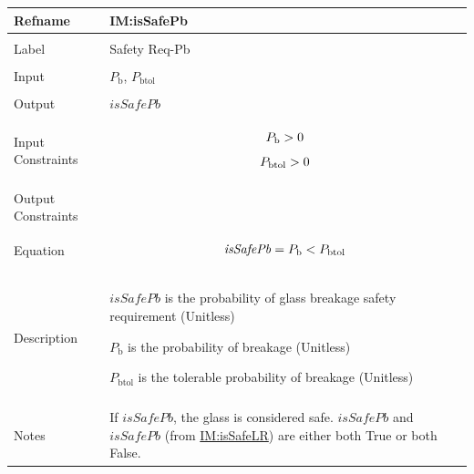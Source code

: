 \documentclass[12pt]{article}
\newcommand{\gt}{\ensuremath >}
\newcommand{\lt}{\ensuremath <}
\begin{document}
\begin{minipage}{\textwidth}
\begin{tabular}{>{\raggedright}p{}>{\raggedright\arraybackslash}p{}}
\toprule \textbf{Refname} & \textbf{IM:isSafePb}
\label{IM:isSafePb}
\\ \midrule \\
Label & Safety Req-Pb
        
\\ \midrule \\
Input & ${P_{\text{b}}}$, ${P_{\text{b}\text{tol}}}$
        
\\ \midrule \\
Output & $\mathit{isSafePb}$
         
\\ \midrule \\
Input Constraints & \begin{displaymath}
                    {P_{\text{b}}}\gt{}0
                    \end{displaymath}
                    \begin{displaymath}
                    {P_{\text{b}\text{tol}}}\gt{}0
                    \end{displaymath}
\\ \midrule \\
Output Constraints & 
\\ \midrule \\
Equation & \begin{displaymath}
           \mathit{isSafePb}={P_{\text{b}}}\lt{}{P_{\text{b}\text{tol}}}
           \end{displaymath}
\\ \midrule \\
Description & \begin{symbDescription}
              \item{$\mathit{isSafePb}$ is the probability of glass breakage safety requirement (Unitless)}
              \item{${P_{\text{b}}}$ is the probability of breakage (Unitless)}
              \item{${P_{\text{b}\text{tol}}}$ is the tolerable probability of breakage (Unitless)}
              \end{symbDescription}
\\ \midrule \\
Notes & If $\mathit{isSafePb}$, the glass is considered safe. $\mathit{isSafePb}$ and $\mathit{isSafePb}$ (from \hyperref[IM:isSafeLR]{IM:isSafeLR}) are either both True or both False.
        

\end{tabular}
\end{minipage}
\end{document}
